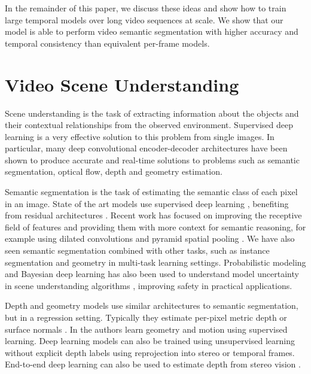 In the remainder of this paper, we discuss these ideas and show how to train large temporal models over long video sequences at scale. We show that our model is able to perform video semantic segmentation with higher accuracy and temporal consistency than equivalent per-frame models.



\section{Video Scene Understanding} 

Scene understanding is the task of extracting information about the objects and their contextual relationships from the observed environment. Supervised deep learning is a very effective solution to this problem from single images. In particular, many deep convolutional encoder-decoder architectures have been shown to produce accurate and real-time solutions to problems such as semantic segmentation, optical flow, depth and geometry estimation.

Semantic segmentation is the task of estimating the semantic class of each pixel in an image. State of the art models use supervised deep learning \cite{badrinarayanan2017segnet,long2015fully}, benefiting from residual architectures \cite{he2016deep,huang2017densely}. Recent work has focused on improving the receptive field of features and providing them with more context for semantic reasoning, for example using dilated convolutions \cite{YuKoltun2016} and pyramid spatial pooling \cite{zhao2017pspnet}. We have also seen semantic segmentation combined with other tasks, such as instance segmentation \cite{he2017maskrcnn} and geometry \cite{kendall2017multi} in multi-task learning settings. Probabilistic modeling and Bayesian deep learning has also been used to understand model uncertainty in scene understanding algorithms \cite{kendall2017uncertainties,kendall2015bayesian}, improving safety in practical applications.

Depth and geometry models use similar architectures to semantic segmentation, but in a regression setting. Typically they estimate per-pixel metric depth or surface normals \cite{eigen2015predicting}. In \cite{UZUMIDB17} the authors learn geometry and motion using supervised learning. Deep learning models can also be trained using unsupervised learning without explicit depth labels using reprojection into stereo \cite{garg2016unsupervised} or temporal \cite{zhou2017unsupervised} frames. End-to-end deep learning can also be used to estimate depth from stereo vision \cite{kendall2017end}.

